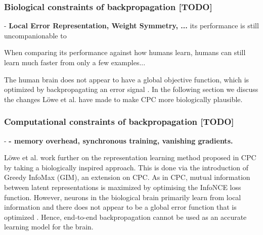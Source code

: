 	\subsubsection{Biological constraints of backpropagation [TODO]}
		- \textbf{Local Error Representation, Weight Symmetry, ...}
		its performance is still uncompanionable to 
		
		When comparing its performance against how humans learn, humans can still learn much faster from only a few examples... 
		
		The human brain does not appear to have a global objective function, which is optimized by backpropagating an error signal \cite{marblestoneIntegrationDeepLearning2016}. In the following section we discuss the changes Löwe et al. have made to make CPC more biologically plausible.
		
	\subsubsection{Computational constraints of backpropagation [TODO]}
		- \textbf{- memory overhead, synchronous training, vanishing gradients.}
		
	
	Löwe et al. work further on the representation learning method proposed in CPC by taking a biologically inspired approach. This is done via the introduction of Greedy InfoMax (GIM), an extension on CPC. As in CPC, mutual information between latent representations is maximized by optimising the InfoNCE loss function. However, neurons in the biological brain primarily learn from local information and there does not appear to be a global error function that is optimized \cite{caporaleSpikeTimingdependentPlasticity2008}. Hence, end-to-end backpropagation cannot be used as an accurate learning model for the brain. 



